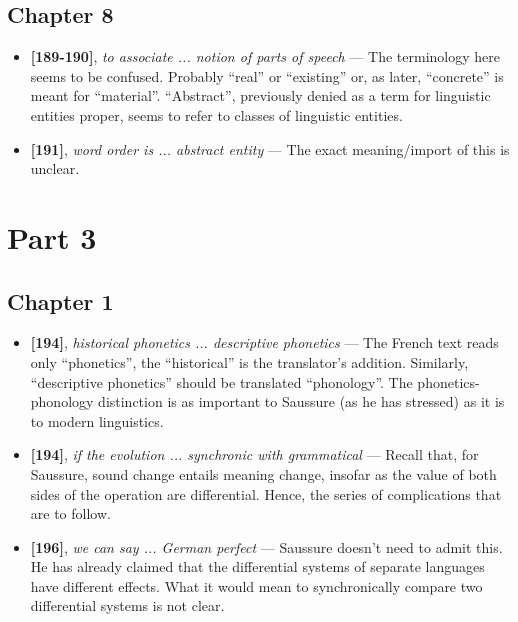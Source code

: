 \documentclass[12pt]{article}
\begin{document}
\subsection{Chapter 8}

\begin{itemize}

\item \textbf{[189-190]}, \textit{to associate ... notion of parts of speech} --- The terminology here seems to be confused. Probably ``real'' or ``existing'' or, as later, ``concrete'' is meant for ``material''. ``Abstract'', previously denied as a term for linguistic entities proper, seems to refer to classes of linguistic entities.

\item \textbf{[191]}, \textit{word order is ... abstract entity} --- The exact meaning/import of this is unclear.

\end{itemize}

\section{Part 3}

\subsection{Chapter 1}

\begin{itemize}

\item \textbf{[194]}, \textit{historical phonetics ... descriptive phonetics} --- The French text reads only ``phonetics'', the ``historical'' is the translator's addition. Similarly, ``descriptive phonetics'' should be translated ``phonology''. The phonetics-phonology distinction is as important to Saussure (as he has stressed) as it is to modern linguistics.

\item \textbf{[194]}, \textit{if the evolution ... synchronic with grammatical} --- Recall that, for Saussure, sound change entails meaning change, insofar as the value of both sides of the operation are differential. Hence, the series of complications that are to follow. 

\item \textbf{[196]}, \textit{we can say ... German perfect} --- Saussure doesn't need to admit this. He has already claimed that the differential systems of separate languages have different effects. What it would mean to synchronically compare two differential systems is not clear.

\end{itemize}
\end{document}

